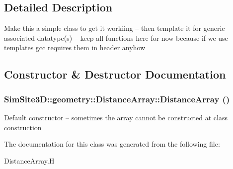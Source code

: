 \subsection{Detailed Description}
Make this a simple class to get it workiing -- then template it for generic associated datatype(s) -- keep all functions here for now because if we use templates gcc requires them in header anyhow 



\subsection{Constructor \& Destructor Documentation}
\subsubsection{\setlength{\rightskip}{0pt plus 5cm}SimSite3D::geometry::Distance\-Array::Distance\-Array ()\hspace{0.3cm}{\tt  [inline]}}\label{classSimSite3D_1_1geometry_1_1DistanceArray_2c29de984a15b6bd3269988d1296667b}


Default constructor -- sometimes the array cannot be constructed at class construction 

The documentation for this class was generated from the following file:\begin{CompactItemize}
\item 
Distance\-Array.H\end{CompactItemize}
